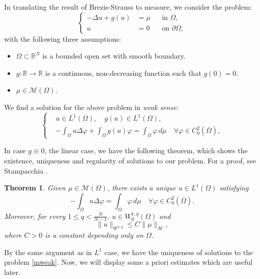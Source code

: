 \documentclass[a4paper, 11pt]{report}
\newtheorem{thm}{Theorem}[chapter]
\theoremstyle{definition}\newtheorem*{rmk}{Remark}
\begin{document}
In translating the result of Brezis-Strauss to measure, we consider the problem:
\begin{equation}\label{mmain}
\left\{
\begin{aligned}
-\Delta u + g(u) & = \mu && \text{in } \Omega , \\
u & = 0 && \text{on } \partial \Omega ,
\end{aligned}
\right.
\end{equation}
with the following three assumptions:
\begin{itemize}
\item $\Omega \subset \mathbb{R}^N$ is a bounded open set with smooth boundary.
\item $g: \mathbb{R} \to \mathbb{R}$ is a continuous, non-decreasing function such that $g(0) = 0$.
\item $\mu \in \mathcal{M}(\Omega)$.
\end{itemize}

We find a solution for the above problem in \emph{weak sense}:
\begin{equation}\label{mweak}
\left\{
\begin{aligned}
& u \in L^1(\Omega ),\quad g(u) \in L^1(\Omega ) ,\\
&-\int_{\Omega} u \Delta \varphi + \int_{\Omega} g(u)\varphi = \int_{\Omega}\varphi\, d\mu \quad \forall \varphi \in C^2_0(\overline{\Omega}) ,
\end{aligned}
\right.
\end{equation}

In case $g \equiv 0$, the linear case, we have the following theorem, which shows the existence, uniqueness and regularity of solutions to our problem. For a proof, see Stampacchia \cite[Th\'eor\`eme 9.1]{S}.
\begin{thm}\label{lithm}
Given $\mu \in \mathcal{M}(\Omega)$, there exists a unique $u\in L^1(\Omega)$ satisfying
\[
-\int_{\Omega}u\Delta \varphi = \int_{\Omega}\varphi \, d\mu \quad \forall \varphi\in C_0^2(\overline{\Omega}).
\]
Moreover, for every $1\le q < \frac{N}{N-1}$, $u\in W^{1,q}_0(\Omega)$ and
\[
\| u\|_{W^{1,q}} \le C \| \mu \|_{\mathcal{M}},
\]
where $C>0$ is a constant depending only on $\Omega$.
\end{thm}

By the same argument as in $L^1$ case, we have the uniqueness of solutions to the problem \eqref{mweak}. Now, we will display some a priori estimates which are useful later.
\end{document}
